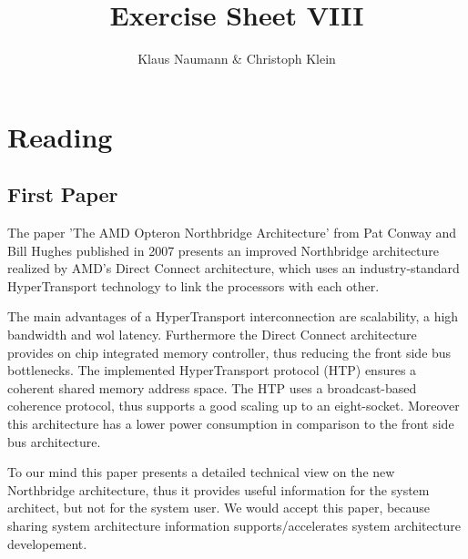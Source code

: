 \documentclass[oneside,a4paper]{scrartcl}
\begin{document}

\title{Exercise Sheet VIII}
\subject{Advanced Parallel Computing}
\author{Klaus Naumann \& Christoph Klein}
\maketitle

\section*{Reading}
\subsection*{First Paper}
The paper 'The AMD Opteron Northbridge Architecture' from Pat Conway and Bill Hughes
published in 2007 presents an improved Northbridge architecture realized by AMD's
Direct Connect architecture, which uses an industry-standard HyperTransport technology
to link the processors with each other.

The main advantages of a HyperTransport interconnection are scalability, a high
bandwidth and wol latency. Furthermore the Direct Connect architecture provides
on chip integrated memory controller, thus reducing the front side bus bottlenecks.
The implemented HyperTransport protocol (HTP) ensures a coherent shared memory address
space. The HTP uses a broadcast-based coherence protocol, thus supports a good scaling
up to an eight-socket. Moreover this architecture has a lower power consumption
in comparison to the front side bus architecture.

To our mind this paper presents a detailed technical view on the new Northbridge
architecture, thus it provides useful information for the system architect, but not for
the system user. We would accept this paper, because sharing system architecture information
supports/accelerates system architecture developement.
\end{document}
